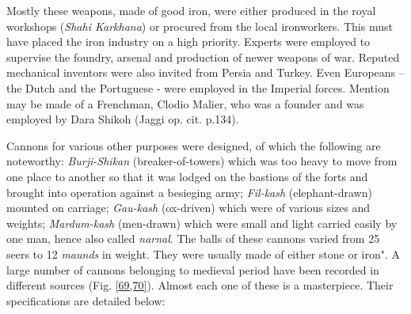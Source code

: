 Mostly these weapons, made of good iron, were either produced in the royal workshops ({\it Shahi Karkhana}) or procured from the local ironworkers. This must have placed the iron industry on a high priority. Experts were employed to supervise the foundry, arsenal and production of newer weapons of war. Reputed mechanical inventors were also invited from Persia and Turkey. Even Europeans – the Dutch and the Portuguese - were employed in the Imperial forces. Mention may be made of a Frenchman, Clodio Malier, who was a founder and was employed by Dara Shikoh (Jaggi op. cit. p.134).

Cannons for various other purposes were designed, of which the following are noteworthy: {\it Burji-Shikan} (breaker-of-towers) which was too heavy to move from one place to another so that it was lodged on the bastions of the forts and brought into operation against a besieging army; {\it Fil-kash} (elephant-drawn) mounted on carriage; {\it Gau-kash} (ox-driven) which were of various sizes and weights; {\it Mardum-kash} (men-drawn) which were small and light carried easily by one man, hence also called {\it narnal}. The balls of these cannons varied from 25 seers to 12 {\it maunds} in weight. They were usually made of either stone or iron". A large number of cannons belonging to medieval period have been recorded in different sources (Fig. \ref{69,70}). Almost each one of these is a masterpiece. Their specifications are detailed below:
